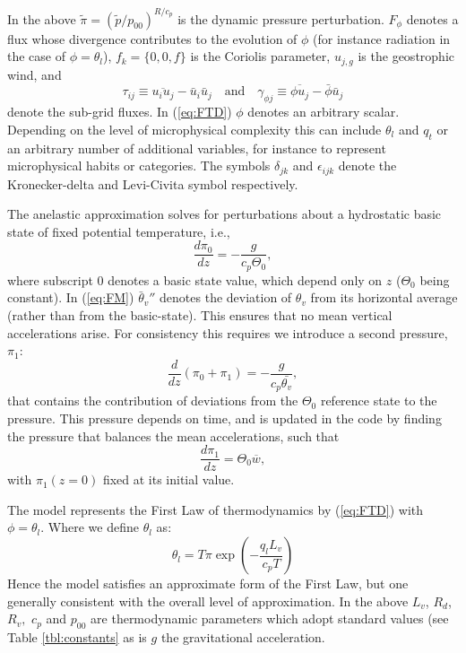 \documentclass[11pt,a4paper]{article}
\begin{document}
In the above $\tilde{\pi}=(\tilde{p}/p_{00})^{R/c_p}$ is the dynamic
pressure perturbation.
$F_\phi$ denotes a flux whose divergence contributes to the evolution
of $\phi$ (for instance radiation in the case of $\phi = \theta_l$),
$f_k = \{0,0,f\}$ is the Coriolis parameter, $u_{j,g}$ is the
geostrophic wind, and
\begin{equation}
\tau_{ij} \equiv \overline{u_i u_j} - \bar{u}_i \bar{u}_j \quad
\text{and} \quad \gamma_{\phi j} \equiv \overline{\phi u_j} -
\bar{\phi} \bar{u}_j
\end{equation}
denote the sub-grid fluxes.  In (\ref{eq:FTD}) $\phi$ denotes an
arbitrary scalar.  Depending on the level of microphysical complexity
this can include $\theta_l$ and $q_t$ or an arbitrary number of
additional variables, for instance to represent microphysical habits
or categories.  The symbols $\delta_{jk}$ and $\epsilon_{ijk}$ denote
the Kronecker-delta and Levi-Civita symbol respectively.

The anelastic approximation solves for perturbations about a
hydrostatic basic state of fixed potential temperature, i.e.,
\begin{equation}
\frac{d\pi_0}{dz} = -\frac{g}{c_p\Theta_0},
\end{equation}
where subscript $0$ denotes a basic state value, which depend only on
$z$ ($\Theta_0$ being constant).  In (\ref{eq:FM}) $\bar{\theta}_v''$
denotes the deviation of $\theta_v$ from its horizontal average
(rather than from the basic-state).  This ensures that no mean
vertical accelerations arise.  For consistency this requires we
introduce a second pressure, $\pi_1:$
\begin{equation}
\frac{d}{dz}(\pi_0 + \pi_1) = -\frac{g}{c_p\bar{\theta_v}},
\end{equation}
that contains the contribution of deviations from the $\Theta_0$
reference state to the pressure.  This pressure depends on time, and
is updated in the code by finding the pressure that balances the mean
accelerations, such that
\begin{equation}
\frac{d\pi_1}{dz} = \Theta_0 \overline{w},
\end{equation}
with $\pi_1(z=0)$ fixed at its initial value.

The model represents the First Law of thermodynamics by (\ref{eq:FTD})
with $\phi=\theta_l.$  Where we define $\theta_l$ as:
\begin{equation}
\theta_l = T\pi \exp\left(-\frac{q_lL_v}{c_pT} \right)
\label{eq:thetal}
\end{equation} 
Hence the model satisfies an approximate form of the First Law, but
one generally consistent with the overall level of approximation. In
the above $L_v$, $R_d$, $R_v,$ $c_p$ and $p_{00}$ are thermodynamic
parameters which adopt standard values (see Table \ref{tbl:constants}
as is $g$ the gravitational acceleration.
\end{document}
